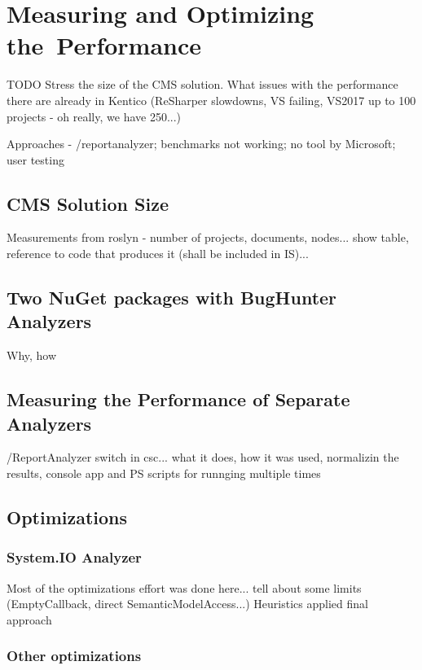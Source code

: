 \documentclass[
  digital, %
  table,   %
  lof,     %
  lot,     %
  oneside,
]{fithesis3}
\begin{document}
\chapter{Measuring and Optimizing the~Performance}
\label{chap:performance}
TODO 
Stress the size of the CMS solution. What issues with the performance there are already in Kentico (ReSharper slowdowns, VS failing, VS2017 up to 100 projects - oh really, we have 250...)

Approaches - /reportanalyzer; benchmarks not working; no tool by Microsoft; user testing

\section{CMS Solution Size}
Measurements from roslyn - number of projects, documents, nodes... show table, reference to code that produces it (shall be included in IS)... 

\section{Two NuGet packages with BugHunter Analyzers}
Why, how

\section{Measuring the Performance of Separate Analyzers}
/ReportAnalyzer switch in csc... what it does, how it was used, normalizin the results, console app and PS scripts for runnging multiple times

\section{Optimizations}

\subsection{System.IO Analyzer}
Most of the optimizations effort was done here...
tell about some limits (EmptyCallback, direct SemanticModelAccess...)
Heuristics applied
final approach

\subsection{Other optimizations}
\end{document}

